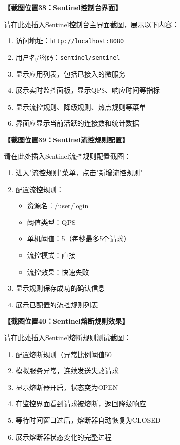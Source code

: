 \documentclass[a4paper,12pt]{article}
\begin{document}
\textbf{【截图位置38：Sentinel控制台界面】}

请在此处插入Sentinel控制台主界面截图，展示以下内容：
\begin{enumerate}
\item 访问地址：\texttt{http://localhost:8080}
\item 用户名/密码：\texttt{sentinel/sentinel}
\item 显示应用列表，包括已接入的微服务
\item 展示实时监控面板，显示QPS、响应时间等指标
\item 显示流控规则、降级规则、热点规则等菜单
\item 界面应显示当前活跃的连接数和统计数据
\end{enumerate}

\textbf{【截图位置39：Sentinel流控规则配置】}

请在此处插入Sentinel流控规则配置截图：
\begin{enumerate}
\item 进入"流控规则"菜单，点击"新增流控规则"
\item 配置流控规则：
  \begin{itemize}
    \item 资源名：/user/login
    \item 阈值类型：QPS
    \item 单机阈值：5（每秒最多5个请求）
    \item 流控模式：直接
    \item 流控效果：快速失败
  \end{itemize}
\item 显示规则保存成功的确认信息
\item 展示已配置的流控规则列表
\end{enumerate}

\textbf{【截图位置40：Sentinel熔断规则效果】}

请在此处插入Sentinel熔断规则测试截图：
\begin{enumerate}
\item 配置熔断规则（异常比例阈值50%
\item 模拟服务异常，连续发送失败请求
\item 显示熔断器开启，状态变为OPEN
\item 在监控界面看到请求被熔断，返回降级响应
\item 等待时间窗口过后，熔断器自动恢复为CLOSED
\item 展示熔断器状态变化的完整过程
\end{enumerate}
\end{document}
